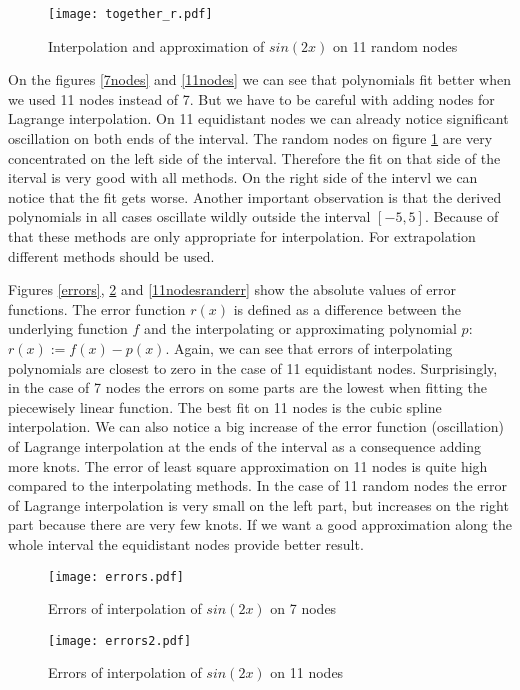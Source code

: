 \documentclass[a4paper,10pt]{article}
\begin{document}
\begin{figure}[h!]
\centering
\texttt{[image: together\_r.pdf]}
\caption{Interpolation and approximation of $sin(2x)$ on 11 random nodes}
\label{11nodesrand}
\end{figure}


On the figures \ref{7nodes} and \ref{11nodes} we can see that polynomials fit better when we used 11 nodes instead of 7. But we have to be careful with adding nodes for Lagrange interpolation.
On 11 equidistant nodes we can already notice significant oscillation on both ends of the interval.
The random nodes on figure \ref{11nodesrand} are very concentrated on the left side of the interval. Therefore the fit on that side of the iterval is very good with all methods. On the right side of the intervl we can notice that the fit gets worse.
Another important observation is that the derived polynomials in all cases oscillate wildly outside the interval $[-5,5]$.
Because of that these methods are only appropriate for interpolation. For extrapolation different methods should be used.



Figures \ref{errors}, \ref{errors2} and \ref{11nodesranderr} show the absolute values of error functions. The error function $r(x)$ is defined as a difference between the underlying function $f$ and the interpolating or approximating polynomial $p$: $r(x):=f(x)-p(x)$.
Again, we can see that errors of interpolating polynomials are closest to zero in the case of 11 equidistant nodes.
Surprisingly, in the case of 7 nodes the errors on some parts are the lowest when fitting the piecewisely linear function.
The best fit on 11 nodes is the cubic spline interpolation.
We can also notice a big increase of the error function (oscillation) of Lagrange interpolation at the ends of the interval as a consequence adding more knots.
The error of least square approximation on 11 nodes is quite high compared to the interpolating methods.
In the case of 11 random nodes the error of Lagrange interpolation is very small on the left part, but increases on the right part because there are very few knots.
If we want a good approximation along the whole interval the equidistant nodes provide better result.
 

\begin{figure}[h!]
        \begin{minipage}[b]{0.5\linewidth}
            \centering
            \texttt{[image: errors.pdf]}
            \caption{Errors of interpolation of $sin(2x)$ on 7 nodes}
            \label{errors}
        \end{minipage}
        \hspace{0.5cm}
        \begin{minipage}[b]{0.5\linewidth}
            \centering
            \texttt{[image: errors2.pdf]}
            \caption{Errors of interpolation of $sin(2x)$ on 11 nodes}
            \label{errors2}
        \end{minipage}
    \end{figure}
\end{document}
